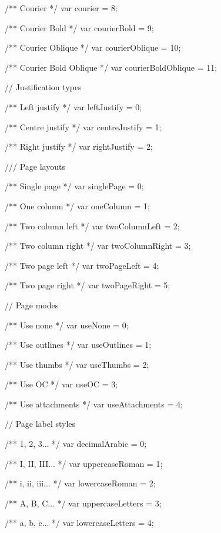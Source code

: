/** Courier */
var courier = 8;

/** Courier Bold */
var courierBold = 9;

/** Courier Oblique */
var courierOblique = 10;

/** Courier Bold Oblique */
var courierBoldOblique = 11;


// Justification types

/** Left justify */
var leftJustify = 0;

/** Centre justify */
var centreJustify = 1;

/** Right justify */
var rightJustify = 2;


/// Page layouts

/** Single page */
var singlePage = 0;

/** One column */
var oneColumn = 1;

/** Two column left */
var twoColumnLeft = 2;

/** Two column right */
var twoColumnRight = 3;

/** Two page left */
var twoPageLeft = 4;

/** Two page right */
var twoPageRight = 5;


// Page modes

/** Use none */
var useNone = 0;

/** Use outlines */
var useOutlines = 1;

/** Use thumbs */
var useThumbs = 2;

/** Use OC */
var useOC = 3;

/** Use attachments */
var useAttachments = 4;


// Page label styles

/** 1, 2, 3... */
var decimalArabic = 0;

/** I, II, III... */
var uppercaseRoman = 1;

/** i, ii, iii... */
var lowercaseRoman = 2;

/** A, B, C... */
var uppercaseLetters = 3;

/** a, b, c... */
var lowercaseLetters = 4;
